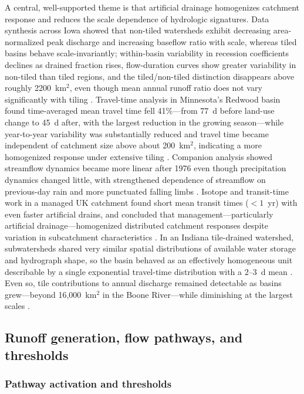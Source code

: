 \documentclass[11pt]{article}
\begin{document}
A central, well-supported theme is that artificial drainage homogenizes catchment response and reduces the scale dependence of hydrologic signatures. Data synthesis across Iowa showed that non-tiled watersheds exhibit decreasing area-normalized peak discharge and increasing baseflow ratio with scale, whereas tiled basins behave scale-invariantly; within-basin variability in recession coefficients declines as drained fraction rises, flow-duration curves show greater variability in non-tiled than tiled regions, and the tiled/non-tiled distinction disappears above roughly 2200~km$^2$, even though mean annual runoff ratio does not vary significantly with tiling \parencite{BolandBrien2014}. Travel-time analysis in Minnesota's Redwood basin found time-averaged mean travel time fell 41\%---from 77~d before land-use change to 45~d after, with the largest reduction in the growing season---while year-to-year variability was substantially reduced and travel time became independent of catchment size above about 200~km$^2$, indicating a more homogenized response under extensive tiling \parencite{DaneshYazdi2016}. Companion analysis showed streamflow dynamics became more linear after 1976 even though precipitation dynamics changed little, with strengthened dependence of streamflow on previous-day rain and more punctuated falling limbs \parencite{FoufoulaGeorgiou2015}. Isotope and transit-time work in a managed UK catchment found short mean transit times ($<1$~yr) with even faster artificial drains, and concluded that management---particularly artificial drainage---homogenized distributed catchment responses despite variation in subcatchment characteristics \parencite{DimitrovaPetrova2020}. In an Indiana tile-drained watershed, subwatersheds shared very similar spatial distributions of available water storage and hydrograph shape, so the basin behaved as an effectively homogeneous unit describable by a single exponential travel-time distribution with a 2--3~d mean \parencite{Basu2010}. Even so, tile contributions to annual discharge remained detectable as basins grew---beyond 16{,}000~km$^2$ in the Boone River---while diminishing at the largest scales \parencite{Schilling2019}.

\subsection{Runoff generation, flow pathways, and thresholds}

\subsubsection{Pathway activation and thresholds}
\end{document}

